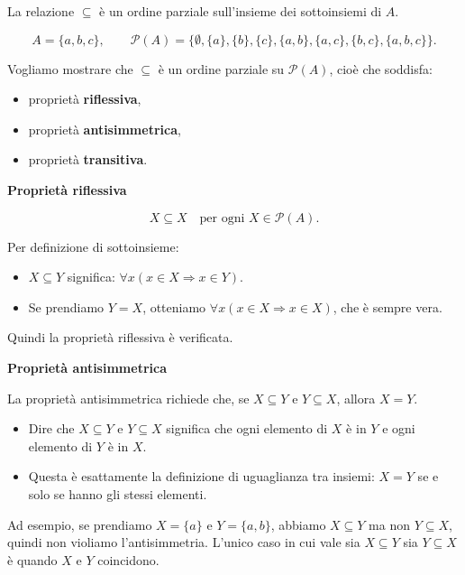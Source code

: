 \begin{esempio}
La relazione $\subseteq$ è un ordine parziale sull'insieme dei sottoinsiemi di \(A\).

\[
A = \{a, b, c\}, \qquad \mathcal{P}(A) = \bigl\{ \emptyset, \{a\}, \{b\}, \{c\}, \{a, b\}, \{a, c\}, \{b, c\}, \{a, b, c\} \bigr\}.
\]
\begin{strategiabox}
    Vogliamo mostrare che $\subseteq$ è un ordine parziale su $\mathcal{P}(A)$, cioè che soddisfa:
\begin{itemize}
    \item proprietà \textbf{riflessiva},
    \item proprietà \textbf{antisimmetrica},
    \item proprietà \textbf{transitiva}.
\end{itemize}
\end{strategiabox}


\medskip
\textbf{Proprietà riflessiva}

\[
X \subseteq X \quad \text{per ogni } X \in \mathcal{P}(A).
\]

Per definizione di sottoinsieme:
\begin{itemize}
    \item $X \subseteq Y$ significa: \(\forall x (x \in X \Rightarrow x \in Y)\).
    \item Se prendiamo $Y = X$, otteniamo \(\forall x (x \in X \Rightarrow x \in X)\), che è sempre vera.
\end{itemize}
Quindi la proprietà riflessiva è verificata.

\medskip
\textbf{Proprietà antisimmetrica}

La proprietà antisimmetrica richiede che, se \(X \subseteq Y\) e \(Y \subseteq X\), allora \(X = Y\).

\begin{itemize}
    \item Dire che \(X \subseteq Y\) e \(Y \subseteq X\) significa che ogni elemento di \(X\) è in \(Y\) e ogni elemento di \(Y\) è in \(X\).
    \item Questa è esattamente la definizione di uguaglianza tra insiemi: \(X = Y\) se e solo se hanno gli stessi elementi.
\end{itemize}

Ad esempio, se prendiamo \(X = \{a\}\) e \(Y = \{a, b\}\), abbiamo \(X \subseteq Y\) ma non \(Y \subseteq X\), quindi non violiamo l’antisimmetria. L’unico caso in cui vale sia \(X \subseteq Y\) sia \(Y \subseteq X\) è quando \(X\) e \(Y\) coincidono.


\end{esempio}
